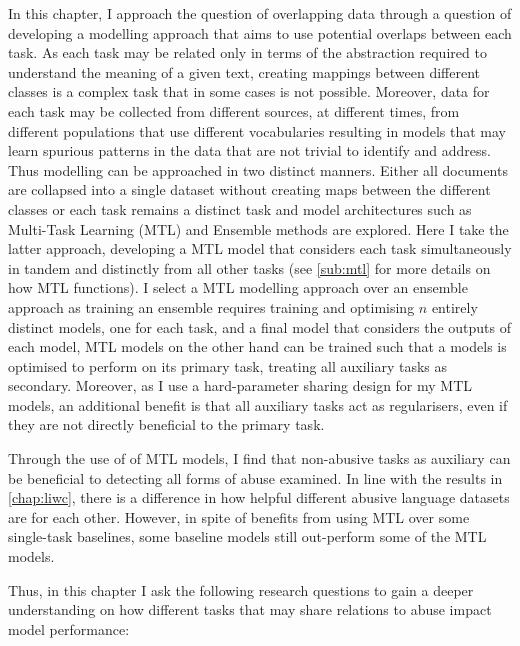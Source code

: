 In this chapter, I approach the question of overlapping data through a question of developing a modelling approach that aims to use potential overlaps between each task.
As each task may be related only in terms of the abstraction required to understand the meaning of a given text, creating mappings between different classes is a complex task that in some cases is not possible.
Moreover, data for each task may be collected from different sources, at different times, from different populations that use different vocabularies resulting in models that may learn spurious patterns in the data that are not trivial to identify and address.
Thus modelling can be approached in two distinct manners. Either all documents are collapsed into a single dataset without creating maps between the different classes or each task remains a distinct task and model architectures such as Multi-Task Learning (MTL) and Ensemble methods are explored.
Here I take the latter approach, developing a MTL model that considers each task simultaneously in tandem and distinctly from all other tasks (see \cref{sub:mtl} for more details on how MTL functions).
I select a MTL modelling approach over an ensemble approach as training an ensemble requires training and optimising $n$ entirely distinct models, one for each task, and a final model that considers the outputs of each model, MTL models on the other hand can be trained such that a models is optimised to perform on its primary task, treating all auxiliary tasks as secondary.
Moreover, as I use a hard-parameter sharing design for my MTL models, an additional benefit is that all auxiliary tasks act as regularisers, even if they are not directly beneficial to the primary task.

Through the use of of MTL models, I find that non-abusive tasks as auxiliary can be beneficial to detecting all forms of abuse examined.
In line with the results in \cref{chap:liwc}, there is a difference in how helpful different abusive language datasets are for each other.
However, in spite of benefits from using MTL over some single-task baselines, some baseline models still out-perform some of the MTL models.


Thus, in this chapter I ask the following research questions to gain a deeper understanding on how different tasks that may share relations to abuse impact model performance:

